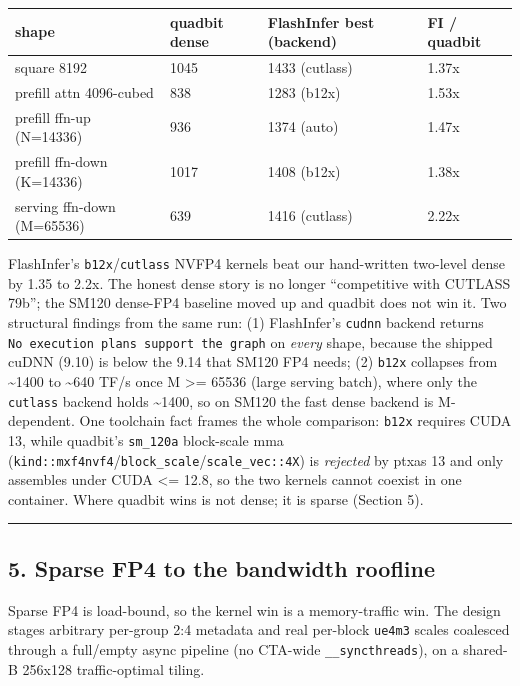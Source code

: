 \documentclass[
]{article}
\begin{document}
\begin{longtable}[]{@{}llll@{}}
\toprule\noalign{}
shape & quadbit dense & FlashInfer best (backend) & FI / quadbit \\
\midrule\noalign{}
\endhead
\bottomrule\noalign{}
\endlastfoot
square 8192 & 1045 & 1433 (cutlass) & 1.37x \\
prefill attn 4096-cubed & 838 & 1283 (b12x) & 1.53x \\
prefill ffn-up (N=14336) & 936 & 1374 (auto) & 1.47x \\
prefill ffn-down (K=14336) & 1017 & 1408 (b12x) & 1.38x \\
serving ffn-down (M=65536) & 639 & 1416 (cutlass) & 2.22x \\
\end{longtable}

FlashInfer's \texttt{b12x}/\texttt{cutlass} NVFP4 kernels beat our
hand-written two-level dense by 1.35 to 2.2x. The honest dense story is
no longer ``competitive with CUTLASS 79b''; the SM120 dense-FP4 baseline
moved up and quadbit does not win it. Two structural findings from the
same run: (1) FlashInfer's \texttt{cudnn} backend returns
\texttt{No\ execution\ plans\ support\ the\ graph} on \emph{every}
shape, because the shipped cuDNN (9.10) is below the 9.14 that SM120 FP4
needs; (2) \texttt{b12x} collapses from \textasciitilde1400 to
\textasciitilde640 TF/s once M \textgreater= 65536 (large serving
batch), where only the \texttt{cutlass} backend holds
\textasciitilde1400, so on SM120 the fast dense backend is M-dependent.
One toolchain fact frames the whole comparison: \texttt{b12x} requires
CUDA 13, while quadbit's \texttt{sm\_120a} block-scale mma
(\texttt{kind::mxf4nvf4}/\texttt{block\_scale}/\texttt{scale\_vec::4X})
is \emph{rejected} by ptxas 13 and only assembles under CUDA \textless=
12.8, so the two kernels cannot coexist in one container. Where quadbit
wins is not dense; it is sparse (Section 5).

\begin{center}\rule{0.5\linewidth}{0.5pt}\end{center}

\subsection{5. Sparse FP4 to the bandwidth
roofline}\label{sparse-fp4-to-the-bandwidth-roofline}

Sparse FP4 is load-bound, so the kernel win is a memory-traffic win. The
design stages arbitrary per-group 2:4 metadata and real per-block
\texttt{ue4m3} scales coalesced through a full/empty async pipeline (no
CTA-wide \texttt{\_\_syncthreads}), on a shared-B 256x128
traffic-optimal tiling.
\end{document}

